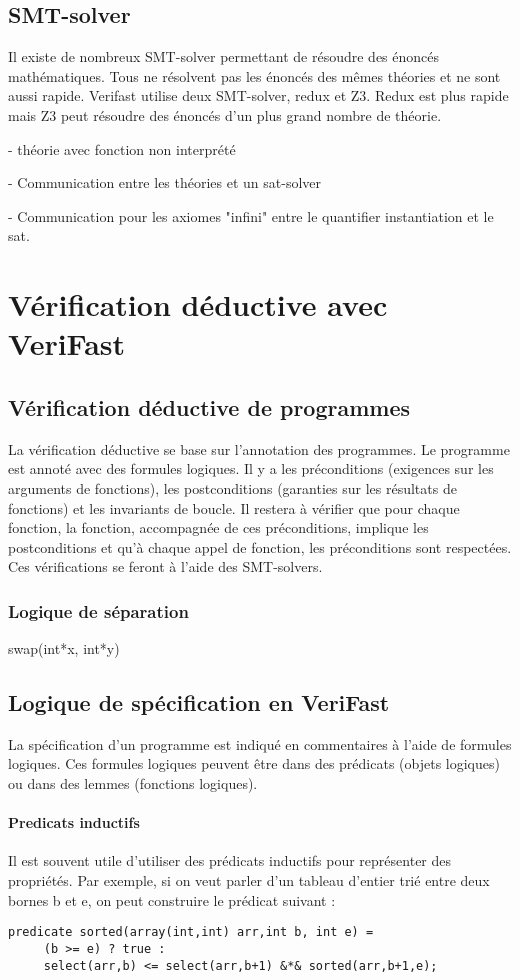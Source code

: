 \documentclass[9pt]{book}
\begin{document}
 	\section{SMT-solver}
 		Il existe de nombreux SMT-solver permettant de r\'esoudre des \'enonc\'es math\'ematiques. Tous ne r\'esolvent pas les \'enonc\'es des m\^emes th\'eories et ne sont aussi rapide. Verifast utilise deux SMT-solver, redux et Z3. Redux est plus rapide mais Z3 peut r\'esoudre des \'enonc\'es d'un plus grand nombre de th\'eorie.
 		
 		- th\'eorie avec fonction non interpr\'et\'e \par
 		- Communication entre les th\'eories et un sat-solver \par
 		- Communication pour les axiomes "infini" entre le quantifier instantiation et le sat.
 		
\chapter{V\'erification d\'eductive avec VeriFast}
	\section{V\'erification d\'eductive de programmes}
		La v\'erification d\'eductive se base sur l'annotation des programmes. Le programme est annot\'e avec des formules logiques. Il y a les pr\'econditions (exigences sur les arguments de fonctions), les postconditions (garanties sur les r\'esultats de fonctions) et les invariants de boucle. Il restera \`a v\'erifier que pour chaque fonction, la fonction, accompagn\'ee de ces pr\'econditions, implique les postconditions et qu'\`a chaque appel de fonction, les pr\'econditions sont respect\'ees. Ces v\'erifications se feront \`a l'aide des SMT-solvers.
		\subsection{Logique de s\'eparation}
			swap(int*x, int*y)
	\section{Logique de sp\'ecification en VeriFast}
		La sp\'ecification d'un programme est indiqu\'e en commentaires \`a l'aide de formules logiques. Ces formules logiques peuvent \^etre dans des pr\'edicats (objets logiques) ou dans des lemmes (fonctions logiques).
		\subsubsection{Predicats inductifs}
			Il est souvent utile d'utiliser des pr\'edicats inductifs pour repr\'esenter des propri\'et\'es. Par exemple, si on veut parler d'un tableau d'entier tri\'e entre deux bornes b et e, on peut construire le pr\'edicat suivant :
			\begin{lstlisting}
predicate sorted(array(int,int) arr,int b, int e) =
     (b >= e) ? true :
     select(arr,b) <= select(arr,b+1) &*& sorted(arr,b+1,e);
			\end{lstlisting}
\end{document}
